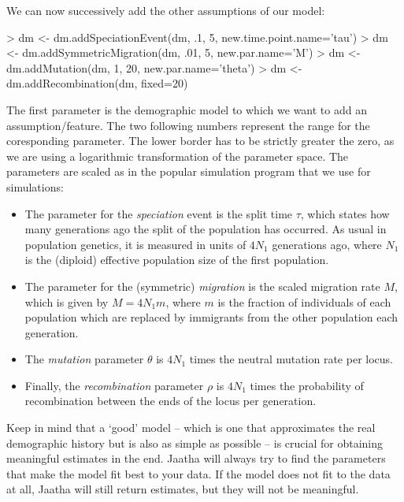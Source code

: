 \documentclass[a4paper]{article}
\begin{document}
We can now successively add the other assumptions of our model:
\begin{Schunk}
\begin{Sinput}
> dm <- dm.addSpeciationEvent(dm, .1, 5, new.time.point.name='tau')
> dm <- dm.addSymmetricMigration(dm, .01, 5, new.par.name='M')
> dm <- dm.addMutation(dm, 1, 20, new.par.name='theta')
> dm <- dm.addRecombination(dm, fixed=20)
\end{Sinput}
\end{Schunk}
The first parameter is the demographic model to which we want to add
an assumption/feature. The two following numbers represent the range for the
coresponding parameter. 
The lower border has to be strictly greater the zero, as we are using a logarithmic transformation
of the parameter space. The parameters are scaled as in the popular simulation program
\verb@ms@ \citep{hudson_generating_2002} that we use for simulations:
\begin{itemize}
\item The parameter for the \emph{speciation} event is the split time $\tau$, which
	states how many generations ago the split of the population has occurred.
	As usual in population genetics, it is measured in units of $4N_1$ 
	generations ago, where $N_1$ is the (diploid) effective population size of 
	the first population.
\item The parameter for the (symmetric) \emph{migration} is the scaled migration rate $M$, 
	which is given by $M=4N_1m$, where $m$ is the fraction of individuals of each 
	population which are replaced by immigrants from the other population each
	generation.
\item The \emph{mutation} parameter $\theta$ is $4N_1$ times the neutral mutation
	rate per locus.
\item Finally, the \emph{recombination} parameter $\rho$ is $4N_1$ times
	the probability of recombination between the ends of the locus per generation.
\end{itemize}

\noindent

Keep in mind that a `good' model -- which is one that approximates the real demographic
history but is also as simple as possible -- is crucial for obtaining meaningful
estimates in the end. Jaatha will always try to find the parameters that make the
model fit best to your data. If the model does not fit to the data at all,
Jaatha will still return estimates, but they will not be meaningful.
\end{document}
